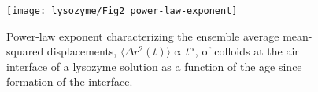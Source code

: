 \begin{figure}
 \texttt{[image: lysozyme/Fig2\_power-law-exponent]}
 \caption[Power-law exponent characterizing $\langle \Delta r^2(t) \rangle \propto t^{\alpha}$ as a function of age]{\label{fig:power-law_expon} Power-law exponent characterizing the ensemble average mean-squared displacements, $\langle \Delta r^2(t) \rangle \propto t^{\alpha}$, of colloids at the air interface of a lysozyme solution as a function of the age since formation of the interface.}
\end{figure}



